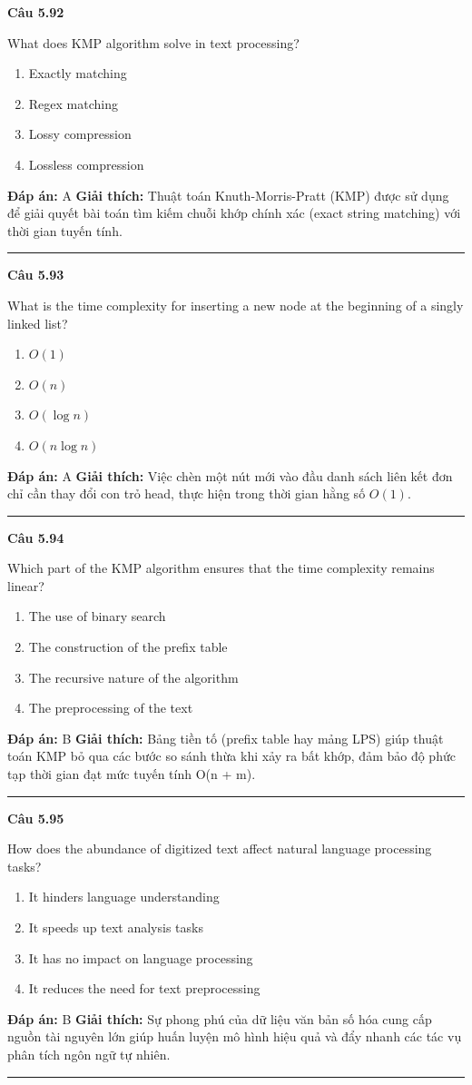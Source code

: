 \documentclass[11pt,a4paper]{article}
\newenvironment{question}[1]{%
  \par\vspace{1em}\noindent\textbf{\large Câu #1}\par\vspace{0.4em}
}{%
  \par\vspace{1em}\hrule\vspace{0.6em}
}
\newenvironment{choices}{%
  \begin{enumerate}[label=\textbf{\Alph*.},leftmargin=2.2em,itemsep=2pt,topsep=3pt]
}{%
  \end{enumerate}
}
\newcommand{\choice}{\item}
\begin{document}
\begin{question}{5.92}
What does KMP algorithm solve in text processing?
\begin{choices}
\choice Exactly matching
\choice Regex matching
\choice Lossy compression
\choice Lossless compression
\end{choices}
\textbf{Đáp án:} A
\textbf{Giải thích:} Thuật toán Knuth-Morris-Pratt (KMP) được sử dụng để giải quyết bài toán tìm kiếm chuỗi khớp chính xác (exact string matching) với thời gian tuyến tính.
\end{question}

\begin{question}{5.93}
What is the time complexity for inserting a new node at the beginning of a singly linked list?
\begin{choices}
\choice $O(1)$
\choice $O(n)$
\choice $O(\log n)$
\choice $O(n \log n)$
\end{choices}
\textbf{Đáp án:} A
\textbf{Giải thích:} Việc chèn một nút mới vào đầu danh sách liên kết đơn chỉ cần thay đổi con trỏ head, thực hiện trong thời gian hằng số $O(1)$.
\end{question}

\begin{question}{5.94}
Which part of the KMP algorithm ensures that the time complexity remains linear?
\begin{choices}
\choice The use of binary search
\choice The construction of the prefix table
\choice The recursive nature of the algorithm
\choice The preprocessing of the text
\end{choices}
\textbf{Đáp án:} B
\textbf{Giải thích:} Bảng tiền tố (prefix table hay mảng LPS) giúp thuật toán KMP bỏ qua các bước so sánh thừa khi xảy ra bất khớp, đảm bảo độ phức tạp thời gian đạt mức tuyến tính O(n + m).
\end{question}

\begin{question}{5.95}
How does the abundance of digitized text affect natural language processing tasks?
\begin{choices}
\choice It hinders language understanding
\choice It speeds up text analysis tasks
\choice It has no impact on language processing
\choice It reduces the need for text preprocessing
\end{choices}
\textbf{Đáp án:} B
\textbf{Giải thích:} Sự phong phú của dữ liệu văn bản số hóa cung cấp nguồn tài nguyên lớn giúp huấn luyện mô hình hiệu quả và đẩy nhanh các tác vụ phân tích ngôn ngữ tự nhiên.
\end{question}
\end{document}
